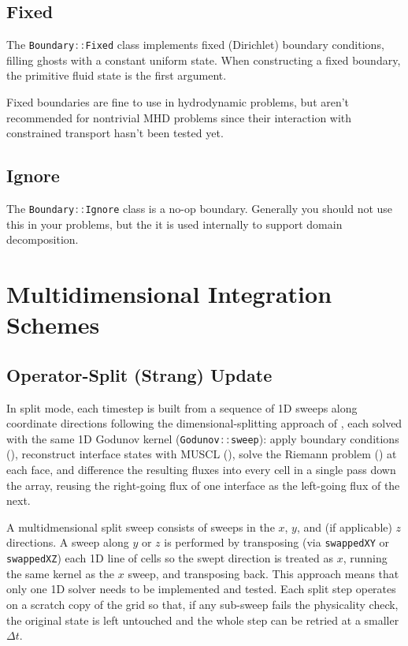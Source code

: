 \documentclass[11pt]{report}
\newcommand{\cpp}[1]{\lstinline[language=C++]{#1}}
\begin{document}
\subsection{Fixed}
The \cpp{Boundary::Fixed} class implements fixed (Dirichlet) boundary conditions, filling ghosts with a constant uniform state. When constructing a fixed boundary, the primitive fluid state is the first argument. 

Fixed boundaries are fine to use in hydrodynamic problems, but aren't recommended for nontrivial MHD problems since their interaction with constrained transport hasn't been tested yet.

\subsection{Ignore}

The \cpp{Boundary::Ignore} class is a no-op boundary. Generally you should not use this in your problems, but the it is used internally to support domain decomposition.



 \section{Multidimensional Integration Schemes}
 \subsection{Operator-Split (Strang) Update}\label{sec:split}

In split mode, each timestep is built from a sequence of 1D sweeps along coordinate directions following the dimensional-splitting approach of \citet{Strang1968}, each solved with the same 1D Godunov kernel (\cpp{Godunov::sweep}): 
apply boundary conditions (), reconstruct interface states with MUSCL (), solve the Riemann problem () at each face, and difference the resulting fluxes into every cell in a single pass down the array, reusing the right-going flux of one interface as the left-going flux of the next.

A multidmensional split sweep consists of sweeps in the $x$, $y$, and (if applicable) $z$ directions. 
A sweep along $y$ or $z$ is performed by transposing (via \cpp{swappedXY} or \cpp{swappedXZ}) each 1D line of cells so the swept direction is treated as $x$, running the same kernel as the $x$ sweep, and transposing back. 
This approach means that only one 1D solver needs to be implemented and tested. 
Each split step operates on a scratch copy of the grid so that, if any sub-sweep fails the physicality check, the original state is left untouched and the whole step can be retried at a smaller $\Delta t$.
\end{document}
